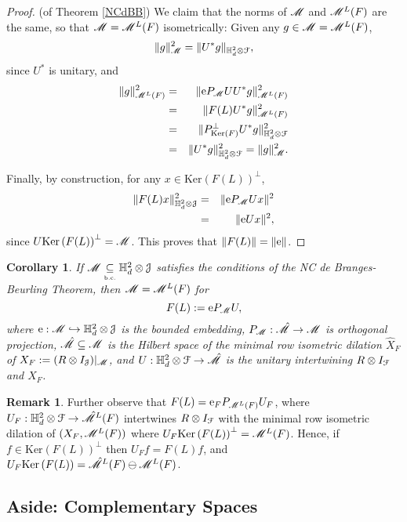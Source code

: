 \documentclass[11pt]{article}
\newcommand{\ba}{\begin{eqnarray}}
\newcommand{\ea}{\end{eqnarray}}
\newcommand{\nn}{\nonumber}
\newcommand{\mr}{\ensuremath{\mathrm}}
\newcommand{\scr}{\ensuremath{\mathscr}}
\newcommand{\mc}{\ensuremath{\mathcal}}
\def\bH{\mathbb{H}}
\def\bc{\underset{\mbox{\tiny \mbox{\tiny b.c.}}}{\subseteq}}
\newcommand{\J}{\ensuremath{\mathcal{J} }}
\renewcommand{\ker}[1]{\ensuremath{\mathrm{Ker} \left( {#1} \right) }}
\numberwithin{equation}{section}
\numberwithin{subsection}{section}
\newtheorem{cor}[subsection]{Corollary}
\theoremstyle{definition}
\newtheorem{remark}[subsection]{Remark}
\begin{document}
\begin{proof}{ (of Theorem \ref{NCdBB}) }
We claim that the norms of $\scr{M}$ and $\scr{M} ^L (F)$ are the same, so that $\scr{M} = \scr{M} ^L (F)$ isometrically:
Given any $g \in \scr{M} = \scr{M} ^L (F)$,
$$ \| g \| ^2 _\scr{M} = \| U^* g \| _{\bH ^2 _d \otimes \mc{F}}, $$ since $U^*$ is unitary, and 
\ba \| g \| ^2 _{\scr{M} ^L (F)} & = & \| \mr{e} P_\scr{M} U U^* g \| ^2 _{\scr{M} ^L (F)} \nn \\
& = & \| F(L) U^* g \| ^2 _{\scr{M} ^L (F)} \nn \\
& = & \|P _{\ker{F}} ^\perp U^* g \| ^2 _{\bH ^2 _d \otimes \mc{F}} \nn \\
& =& \| U^* g \| ^2 _{\bH ^2 _d \otimes \mc{F}} = \| g \| ^2 _{\scr{M}}. \nn \ea 

Finally, by construction, for any $x \in \ker{F(L) } ^\perp$, 
\ba \| F(L) x \| ^2 _{\bH ^2 _d \otimes \J } & = & \| \mr{e} P_\scr{M} U x \| ^2 \nn \\
& = & \| \mr{e} Ux \| ^2, \nn \ea since $U  \ker{F(L)} ^\perp = \scr{M}$. This proves that $\| F(L) \| = \| \mr {e} \|$.
\end{proof}

\begin{cor} \label{Multfactor}
If $\scr{M} \bc \bH ^2 _d \otimes \J$ satisfies the conditions of the NC de Branges-Beurling Theorem, then $\scr{M} = \scr{M} ^L (F)$ for 
$$ F(L) := \mr{e} P_\scr{M} U, $$ where $\mr{e} : \scr{M} \hookrightarrow \bH ^2 _d \otimes \J$ is the bounded embedding, $P_\scr{M} : \hat{\scr{M}} \rightarrow \scr{M}$ is orthogonal projection,
$\hat{\scr{M}} \subseteq \scr{M}$ is the Hilbert space of the minimal row isometric dilation $\hat{X} _F$ of $X_F := (R \otimes I_\J) | _{\scr{M}}$, and $U:\bH ^2 _d \otimes \mc{F} \rightarrow \hat{\scr{M}}$ is the unitary intertwining $R \otimes I_{\mc{F}}$ and $\hat{X} _F$. 
\end{cor}

\begin{remark} \label{ranUF}
Further observe that $F(L) = \mr{e} _F P _{\scr{M} ^L (F )} U_F$, where 
$U_F : \bH ^2 _d \otimes \mc{F} \rightarrow \hat{\scr{M}} ^L (F)$ intertwines $R \otimes I _\mc{F}$ with the minimal row isometric dilation of $(X_F , \scr{M} ^L (F) )$ where $U_F \ker{F(L)} ^\perp = \scr{M} ^L (F)$. Hence, if $f \in \ker{F(L)} ^\perp$ then $U_F f = F(L) f $, and $U_F \ker{F(L)} = \hat{\scr{M}} ^L (F) \ominus \scr{M} ^L (F)$.
\end{remark}


\subsection*{Aside: Complementary Spaces}
\end{document}
